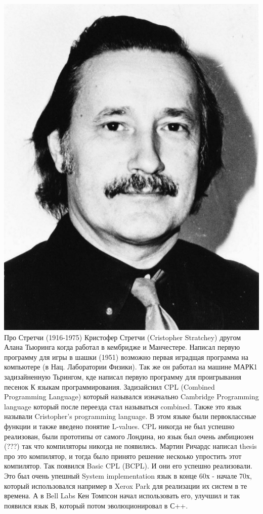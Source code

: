 \documentclass[14pt]{matmex-diploma-custom}
\begin{document}
\includegraphics[angle=0,scale=0.2]{stratchey.jpg}
Про Стретчи (1916-1975)
Кристофер Стретчи (Cristopher Stratchey) другом Алана Тьюринга когда работал в кембридже и Манчестере. Написал первую программу для игры в шашки (1951) возможно первая иградщая программа на компьютере (в Нац. Лаборатории Физики). Так же он работал на машине МАРК1 задизайненную Тьрингом, кде написал первую программу для проигрывания песенок
К языкам программирования. Задизайснил CPL (Combined Programming Language) который назывался изначально Cambridge Programming language который после переезда стал называться combined. Также это язык называли Cristopher’s programming language. В этом языке были первоклассные функции и также введено понятие L-values. CPL никогда не был успешно реализован, были прототипы от самого Лондина, но язык был очень амбициозен (???)  так что компиляторы никогда не появились. Мартин Ричардс написал thesis про это компилятор, и тогда было принято решение нескоько упростить этот компилятор. Так появился Basic CPL (BCPL). И они его успешно реализовали. Это был очень упешный 
 System implementation язык в конце 60х - начале 70х, который использовался например в Xerox Park для реализации их систем в те времена. А в Bell Labs Кен Томпсон начал использовать его, улучшил и так появился язык В, который потом эволюционировал  в С++.
\end{document}
